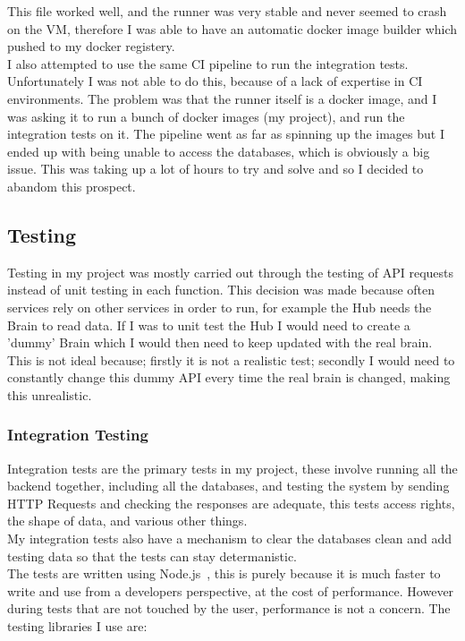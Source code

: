 \documentclass[titlepage]{article}
\begin{document}
This file worked well, and the runner was very stable and never seemed to crash on the VM, therefore I was able to have an automatic docker image builder which pushed to my docker registery. \\

I also attempted to use the same CI pipeline to run the integration tests. Unfortunately I was not able to do this, because of a lack of expertise in CI environments. The problem was that the runner itself is a docker image, and I was asking it to run a bunch of docker images (my project), and run the integration tests on it. The pipeline went as far as spinning up the images but I ended up with being unable to access the databases, which is obviously a big issue. This was taking up a lot of hours to try and solve and so I decided to abandom this prospect. 

\pagebreak
\subsection{Testing}
Testing in my project was mostly carried out through the testing of API requests instead of unit testing in each function. This decision was made because often services rely on other services in order to run, for example the Hub needs the Brain to read data. If I was to unit test the Hub I would need to create a 'dummy' Brain which I would then need to keep updated with the real brain. This is not ideal because; firstly it is not a realistic test; secondly I would need to constantly change this dummy API every time the real brain is changed, making this unrealistic. \\

\subsubsection{Integration Testing}
Integration tests are the primary tests in my project, these involve running all the backend together, including all the databases, and testing the system by sending HTTP Requests and checking the responses are adequate, this tests access rights, the shape of data, and various other things. \\ 
My integration tests also have a mechanism to clear the databases clean and add testing data so that the tests can stay determanistic. \\

The tests are written using Node.js~\cite{nodejs}, this is purely because it is much faster to write and use from a developers perspective, at the cost of performance. However during tests that are not touched by the user, performance is not a concern. The testing libraries I use are:
\end{document}
